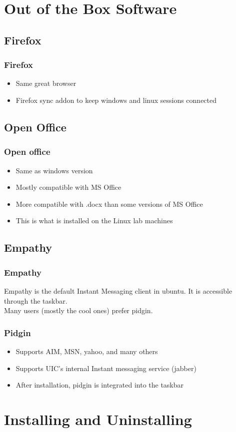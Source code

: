 \documentclass[hyperref={pdfpagelabels=false}]{beamer}
\begin{document}
\section{Out of the Box Software}
\subsection{Firefox}
\frame
{
    \frametitle{Firefox}
    \begin{itemize}
    \item{Same great browser}
    \item{Firefox sync addon to keep windows and linux sessions connected}
    \end{itemize}
}
\subsection{Open Office}
\frame
{
    \frametitle{Open office}
    \begin{itemize}
    \item{Same as windows version}
    \item{Mostly compatible with MS Office}
    \item{More compatible with .docx than some versions of MS Office}
	\item{This is what is installed on the Linux lab machines}
    \end{itemize}
}
\subsection{Empathy}
\frame
{
	\frametitle{Empathy}
	Empathy is the default Instant Messaging client in ubuntu. It is accessible through the taskbar. \\
        Many users (mostly the cool ones) prefer pidgin.
}
\frame
{
	\frametitle{Pidgin}
	\begin{itemize}
	\item{Supports AIM, MSN, yahoo, and many others}
	\item{Supports UIC's internal Instant messaging service (jabber)}
	\item{After installation, pidgin is integrated into the taskbar}
	\end{itemize}
}
\section{Installing and Uninstalling}
\end{document}

